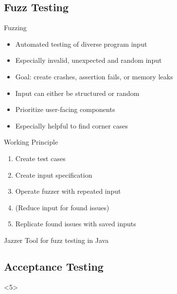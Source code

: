 \subsection{Fuzz Testing}
\begin{frame}{\insertsubsection}
	\begin{fancycolumns}[animation=none]
		\begin{definition}{Fuzzing}
			\begin{itemize}
				\item Automated testing of diverse program input
				\item Especially invalid, unexpected and random input
				\item Goal: create crashes, assertion fails, or memory leaks
				\item Input can either be structured or random
				\item Prioritize user-facing components
				\item Especially helpful to find corner cases
			\end{itemize}
		\end{definition}\pause
		\begin{note}{Working Principle}
			\begin{enumerate}
				\item Create test cases
				\item Create input specification
				\item Operate fuzzer with repeated input
				\item (Reduce input for found issues)
				\item Replicate found issues with saved inputs
			\end{enumerate}
		\end{note} \pause
		\nextcolumn
		 \pause
		\begin{note}{Jazzer}
			Tool for fuzz testing in Java
		\end{note}
	\end{fancycolumns}
\end{frame}

\subsection{Acceptance Testing}
\begin{frame}<5>{\insertsubsection}
	\slideStagesTesting
\end{frame}

